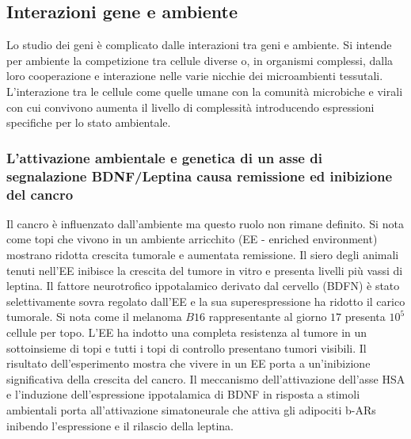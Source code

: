 	\subsection{Interazioni gene e ambiente}
	Lo studio dei geni \`e complicato dalle interazioni tra geni e ambiente. 
	Si intende per ambiente la competizione tra cellule diverse o, in organismi complessi, dalla loro cooperazione e interazione nelle varie nicchie dei microambienti tessutali. 
	L'interazione tra le cellule come quelle umane con la comunit\`a microbiche e virali con cui convivono aumenta il livello di complessit\`a introducendo espressioni specifiche per lo stato ambientale. 

		\subsubsection{L'attivazione ambientale e genetica di un asse di segnalazione BDNF/Leptina causa remissione ed inibizione del cancro}
		Il cancro \`e influenzato dall'ambiente ma questo ruolo non rimane definito. 
		Si nota come topi che vivono in un ambiente arricchito (EE - enriched environment) mostrano ridotta crescita tumorale e aumentata remissione. 
		Il siero degli animali tenuti nell'EE inibisce la crescita del tumore in vitro e presenta livelli pi\`u vassi di leptina. 
		Il fattore neurotrofico ippotalamico derivato dal cervello (BDFN) \`e stato selettivamente sovra regolato dall'EE e la sua superespressione ha ridotto il carico tumorale. 
		Si nota come il melanoma $B16$ rappresentante al giorno $17$ presenta $10^5$ cellule per topo. 
		L'EE ha indotto una completa resistenza al tumore in un sottoinsieme di topi e tutti i topi di controllo presentano tumori visibili. 
		Il risultato dell'esperimento mostra che vivere in un EE porta a un'inibizione significativa della crescita del cancro. 
		Il meccanismo dell'attivazione dell'asse HSA e l'induzione dell'espressione ippotalamica di BDNF in risposta a stimoli ambientali porta all'attivazione simatoneurale che attiva gli adipociti b-ARs inibendo l'espressione e il rilascio della leptina.

